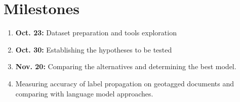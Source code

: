 \documentclass[11pt]{article}
\newcommand{\comment}[1]{}
\begin{document}
\comment{I suggest we remove the next two sections: we're already running over the page limit! -Aidan}

\section{Milestones}
\begin{enumerate}
    \item \textbf{Oct. 23:} Dataset preparation and tools exploration
    \item \textbf{Oct. 30:} Establishing the hypotheses to be tested
    \item \textbf{Nov. 20:} Comparing the alternatives and determining the best model.
    \item Measuring accuracy of label propagation on geotagged documents and comparing with language model approaches.
\end{enumerate}

%



\end{document}
